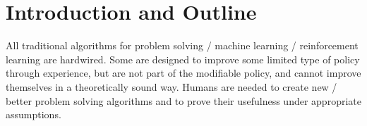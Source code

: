 \begin{titlepage}
\begin{abstract}
\vspace{0.5cm}
\noindent
{\bf Keywords:} self-reference, 
reinforcement learning, 
problem solving, 
proof techniques, optimal
universal search, self-improvement

\vspace{0.5cm}
\noindent
{\bf \gm publications} up to 2006
(100 years after Kurt G\"{o}del's birth, and 75 years 
after his landmark paper 
\cite{Goedel:31}
laying the foundations of
theoretical computer science):
 \cite{Schmidhuber:03gm,Schmidhuber:04gmhtml,Schmidhuber:04oops,Schmidhuber:05icann,Schmidhuber:05gmconscious,Schmidhuber:05gmai}.

\end{abstract}

\end{titlepage}

\tableofcontents
\newpage

\section{Introduction and Outline}
\label{intro}


All traditional algorithms for problem solving /
machine learning /
reinforcement learning \cite{Kaelbling:96}
are hardwired. Some are designed to improve some limited
type of policy through
experience, but are not part of the modifiable policy, 
and cannot improve themselves in a theoretically sound way.
Humans are needed to create 
new / better problem solving algorithms and to prove their 
usefulness under appropriate assumptions.

